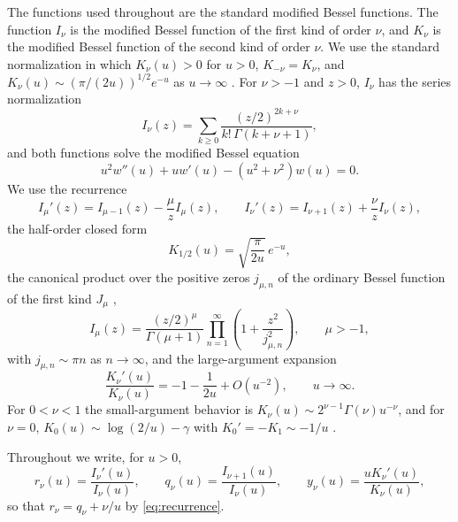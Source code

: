 \documentclass[preprint,12pt]{elsarticle}
\theoremstyle{plain}
\theoremstyle{definition}
\theoremstyle{remark}
\begin{document}
The functions used throughout are the standard modified Bessel functions.
The function \(I_\nu\) is the modified Bessel function of the first kind of
order \(\nu\), and \(K_\nu\) is the modified Bessel function of the second
kind of order \(\nu\). We use the standard normalization in which
\(K_\nu(u)>0\) for \(u>0\), \(K_{-\nu}=K_\nu\), and
\(K_\nu(u)\sim(\pi/(2u))^{1/2}e^{-u}\) as \(u\to\infty\)
\cite{watson,dlmf}. For \(\nu>-1\) and \(z>0\), \(I_\nu\) has the series
normalization
\begin{equation}\label{eq:I-series}
I_\nu(z)=\sum_{k\ge0}\frac{(z/2)^{2k+\nu}}{k!\,\Gamma(k+\nu+1)},
\end{equation}
and both functions solve the modified Bessel equation
\begin{equation}\label{eq:ode}
u^2w''(u)+uw'(u)-(u^2+\nu^2)w(u)=0.
\end{equation}
We use the recurrence \cite[\S3.71]{watson}
\begin{equation}\label{eq:recurrence}
I_\mu'(z)=I_{\mu-1}(z)-\frac{\mu}{z}I_\mu(z),
\qquad
I_\nu'(z)=I_{\nu+1}(z)+\frac{\nu}{z}I_\nu(z),
\end{equation}
the half-order closed form
\begin{equation}\label{eq:halforder}
K_{1/2}(u)=\sqrt{\frac{\pi}{2u}}\,e^{-u},
\end{equation}
the canonical product over the positive zeros \(j_{\mu,n}\) of the ordinary
Bessel function of the first kind \(J_\mu\) \cite[\S15.41]{watson},
\begin{equation}\label{eq:product}
I_\mu(z)=\frac{(z/2)^\mu}{\Gamma(\mu+1)}
\prod_{n=1}^{\infty}\left(1+\frac{z^2}{j_{\mu,n}^2}\right),
\qquad \mu>-1,
\end{equation}
with \(j_{\mu,n}\sim\pi n\) as \(n\to\infty\), and the large-argument
expansion \cite[\S10.40]{dlmf}
\begin{equation}\label{eq:K-asymptotic}
\frac{K_\nu'(u)}{K_\nu(u)}=-1-\frac{1}{2u}+O(u^{-2}),
\qquad u\to\infty.
\end{equation}
For \(0<\nu<1\) the small-argument behavior is
\(K_\nu(u)\sim2^{\nu-1}\Gamma(\nu)u^{-\nu}\), and for \(\nu=0\),
\(K_0(u)\sim\log(2/u)-\gamma\) with \(K_0'=-K_1\sim-1/u\) \cite[\S10.30]{dlmf}.

Throughout we write, for \(u>0\),
\begin{equation}
r_\nu(u)=\frac{I_\nu'(u)}{I_\nu(u)},
\qquad
q_\nu(u)=\frac{I_{\nu+1}(u)}{I_\nu(u)},
\qquad
y_\nu(u)=\frac{uK_\nu'(u)}{K_\nu(u)},
\end{equation}
so that \(r_\nu=q_\nu+\nu/u\) by \eqref{eq:recurrence}.
\end{document}
